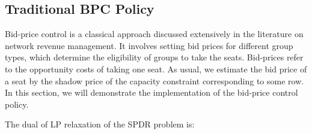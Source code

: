 




\subsection{Traditional BPC Policy}
Bid-price control is a classical approach discussed extensively in the literature on network revenue management. It involves setting bid prices for different group types, which determine the eligibility of groups to take the seats. Bid-prices refer to the opportunity costs of taking one seat. As usual, we estimate the bid price of a seat by the shadow price of the capacity constraint corresponding to some row. In this section, we will demonstrate the implementation of the bid-price control policy. 

The dual of LP relaxation of the SPDR problem is:

